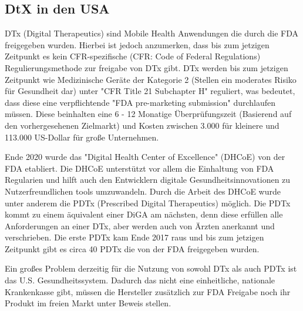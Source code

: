 \documentclass{article}
\begin{document}
		\subsection{DtX in den USA}
			DTx (Digital Therapeutics) sind Mobile Health Anwendungen die durch die FDA freigegeben wurden. Hierbei ist jedoch anzumerken, dass bis zum jetzigen Zeitpunkt es kein CFR-spezifische (CFR: Code of Federal Regulations) Regulierungsmethode zur freigabe von DTx gibt. DTx werden bis zum jetzigen Zeitpunkt wie Medizinische Geräte der Kategorie 2 (Stellen ein moderates Risiko für Gesundheit dar) unter "CFR Title 21 Subchapter H" reguliert, was bedeutet, dass diese eine verpflichtende "FDA pre-marketing submission" durchlaufen müssen. Diese beinhalten eine 6 - 12 Monatige Überprüfungszeit (Basierend auf den vorhergesehenen Zielmarkt) und Kosten zwischen 3.000 für kleinere und 113.000 US-Dollar für große Unternehmen.\par
			Ende 2020 wurde das "Digital Health Center of Excellence" (DHCoE) von der FDA etabliert. Die DHCoE unterstützt vor allem die Einhaltung von FDA Regularien und hilft auch den Entwicklern digitale Gesundheitsinnovationen zu Nutzerfreundlichen tools umzuwandeln. Durch die Arbeit des DHCoE wurde unter anderem die PDTx (Prescribed Digital Therapeutics) möglich. Die PDTx kommt zu einem äquivalent einer DiGA am nächsten, denn diese erfüllen alle Anforderungen an einer DTx, aber werden auch von Ärzten anerkannt und verschrieben. Die erste PDTx kam Ende 2017 raus und bis zum jetzigen Zeitpunkt gibt es circa 40 PDTx die von der FDA freigegeben wurden.\par
			Ein großes Problem derzeitig für die Nutzung von sowohl DTx als auch PDTx ist das U.S. Gesundheitssystem. Dadurch das nicht eine einheitliche, nationale Krankenkasse gibt, müssen die Hersteller zusätzlich zur FDA Freigabe noch ihr Produkt im freien Markt unter Beweis stellen.\cite{dtx-usa}
\end{document}
